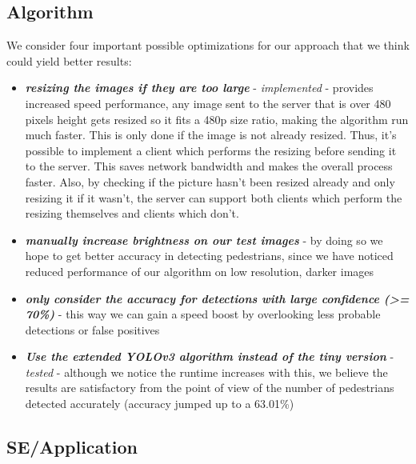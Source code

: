\documentclass[runningheads,a4paper,11pt]{report}
\begin{document}
\subsection{Algorithm}
We consider four important possible optimizations for our approach that we think could yield better results:
\begin{itemize}
    \item \textbf{\emph{resizing the images if they are too large}} - \emph{implemented} - provides increased speed performance, any image sent to the server that is over 480 pixels height gets resized so it fits a 480p size ratio, making the algorithm run much faster. This is only done if the image is not already resized. Thus, it's possible to implement a client which performs the resizing before sending it to the server. This saves network bandwidth and makes the overall process faster. Also, by checking if the picture hasn't been resized already and only resizing it if it wasn't, the server can support both clients which perform the resizing themselves and clients which don't.
    \item \textbf{\emph{manually increase brightness on our test images}} - by doing so we hope to get better accuracy in detecting pedestrians, since we have noticed reduced performance of our algorithm on low resolution, darker images
    \item \textbf{\emph{only consider the accuracy for detections with large confidence (>= 70\%)}} - this way we can gain a speed boost by overlooking less probable detections or false positives
    \item \textbf{\emph{Use the extended YOLOv3 algorithm instead of the tiny version}} - \emph{tested} - although we notice the runtime increases with this, we believe the results are satisfactory from the point of view of the number of pedestrians detected accurately (accuracy jumped up to a 63.01\%)
\end{itemize}

\subsection{SE/Application}
\end{document}
